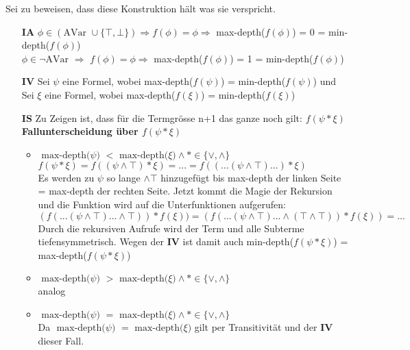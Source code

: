 \documentclass[a4paper,10pt]{scrartcl}
\begin{document}
Sei zu beweisen, dass diese Konstruktion hält was sie verspricht. 

\begin{itemize}
\item[\textbf{IA}]  $\phi \in (\textrm{AVar }  \cup \{\top, \bot  \}) \Rightarrow f(\phi) = \phi \Rightarrow$ max-depth($f(\phi)$) = 0 = min-depth($f(\phi)$) \\
 $\phi \in \lnot\textrm{AVar } \Rightarrow$ $f(\phi) = \phi \Rightarrow$ max-depth($f(\phi)$) = 1 = min-depth($f(\phi)$) 
\item[\textbf{IV}] Sei $\psi$ eine Formel, wobei max-depth($f(\psi)$) =  min-depth($f(\psi)$) und  \\ Sei $\xi$ eine Formel, wobei max-depth($f(\xi)$) = min-depth($f(\xi)$)
\item[\textbf{IS}] Zu Zeigen ist, dass für die Termgrösse n+1 das ganze noch gilt: $f(\psi  * \xi)$ \\
\textbf{Fallunterscheidung über $f(\psi  * \xi)$}
\begin{itemize}
\item $\textrm{ max-depth($\psi$) $<$ max-depth($\xi$)} \land * \in \{ \lor, \land\}$ \\
$f(\psi  * \xi) = f((\psi \land \top)  * \xi) = ... = f((...(\psi \land \top) ...) * \xi)$ \\
Es werden zu $\psi$ so lange $\land \top$ hinzugefügt bis max-depth der linken Seite = max-depth der rechten Seite. Jetzt kommt die Magie der Rekursion und die Funktion wird auf die Unterfunktionen aufgerufen: \\
$(f(...(\psi \land \top) ... \land \top)) * f(\xi)) = (f(...(\psi \land \top) ... \land (\top \land \top)) * f(\xi)) = ... $ \\
Durch die rekursiven Aufrufe wird der Term und alle Subterme tiefensymmetrisch.
Wegen der \textbf{IV} ist damit auch min-depth($f(\psi * \xi)$) = max-depth($f(\psi * \xi)$)
\item $\textrm{ max-depth($\psi$) $>$ max-depth($\xi$)} \land * \in \{ \lor, \land\}$ \\
analog
\item  $\textrm{ max-depth($\psi$) $=$ max-depth($\xi$)} \land * \in \{ \lor, \land\}$ \\
Da $\textrm{ max-depth($\psi$) $=$ max-depth($\xi$)} $ gilt per Transitivität und der \textbf{IV} dieser Fall.
\end{itemize}


\end{itemize}
\end{document}
